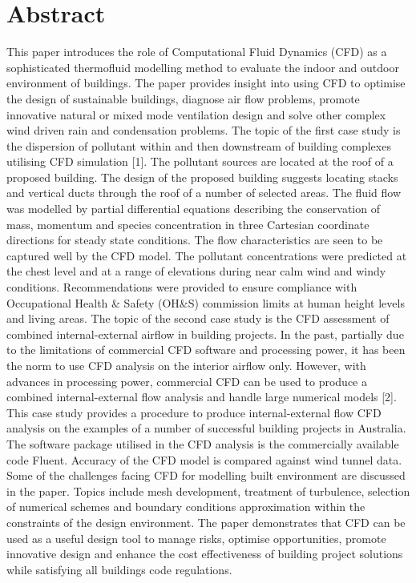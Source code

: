 \documentclass[article, A4, 11pt]{llncs}%
\begin{document}
\section*{Abstract}
This paper introduces the role of Computational Fluid Dynamics (CFD) as a sophisticated thermofluid modelling method to evaluate the indoor and outdoor environment of buildings. The paper provides insight into using CFD to optimise the design of sustainable buildings, diagnose air flow problems, promote innovative natural or mixed mode ventilation design and solve other complex wind driven rain and condensation problems. The topic of the first case study is the dispersion of pollutant within and then downstream of building complexes utilising CFD simulation [1].  The pollutant sources are located at the roof of a proposed building. The design of the proposed building suggests locating stacks and vertical ducts through the roof of a number of selected areas.  The fluid flow was modelled by partial differential equations describing the conservation of mass, momentum and species concentration in three Cartesian coordinate directions for steady state conditions. The flow characteristics are seen to be captured well by the CFD model. The pollutant concentrations were predicted at the chest level and at a range of elevations during near calm wind and windy conditions.  Recommendations were provided to ensure compliance with Occupational Health \& Safety (OH\&S) commission limits at human height levels and living areas. The topic of the second case study is the CFD assessment of combined internal-external airflow in building projects. In the past, partially due to the limitations of commercial CFD software and processing power, it has been the norm to use CFD analysis on the interior airflow only. However, with advances in processing power, commercial CFD can be used to produce a combined internal-external flow analysis and handle large numerical models [2]. This case study provides a procedure to produce internal-external flow CFD analysis on the examples of a number of successful building projects in Australia. The software package utilised in the CFD analysis is the commercially available code Fluent. Accuracy of the CFD model is compared against wind tunnel data. Some of the challenges facing CFD for modelling built environment are discussed in the paper. Topics include mesh development, treatment of turbulence, selection of numerical schemes and boundary conditions approximation within the constraints of the design environment. The paper demonstrates that CFD can be used as a useful design tool to manage risks, optimise opportunities, promote innovative design and enhance the cost effectiveness of building project solutions while satisfying all buildings code regulations.
\end{document}
